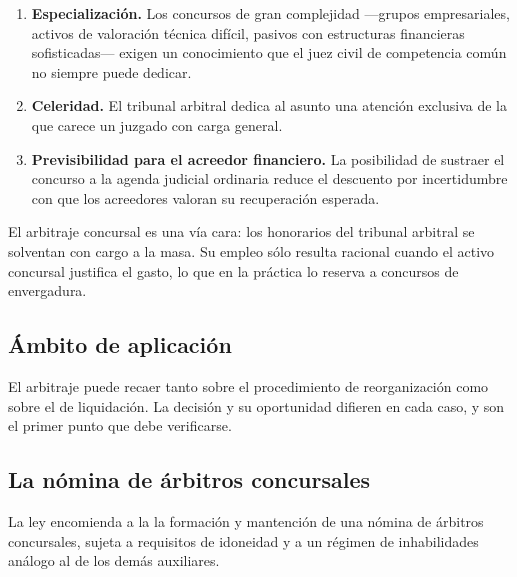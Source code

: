 \begin{enumerate}
  \item \textbf{Especialización.} Los concursos de gran complejidad ---grupos
  empresariales, activos de valoración técnica difícil, pasivos con estructuras
  financieras sofisticadas--- exigen un conocimiento que el juez civil de competencia
  común no siempre puede dedicar.

  \item \textbf{Celeridad.} El tribunal arbitral dedica al asunto una atención exclusiva
  de la que carece un juzgado con carga general.

  \item \textbf{Previsibilidad para el acreedor financiero.} La posibilidad de sustraer
  el concurso a la agenda judicial ordinaria reduce el descuento por incertidumbre con
  que los acreedores valoran su recuperación esperada.
\end{enumerate}

\begin{alerta}
El arbitraje concursal es una vía cara: los honorarios del tribunal arbitral se solventan
con cargo a la masa. Su empleo sólo resulta racional cuando el activo concursal justifica
el gasto, lo que en la práctica lo reserva a concursos de envergadura.
\end{alerta}

\bloqueNormativo

\subsection{Ámbito de aplicación}

El arbitraje puede recaer tanto sobre el procedimiento de reorganización como sobre el de
liquidación. La decisión y su oportunidad difieren en cada caso, y son el primer punto
que debe verificarse.

\subsection{La nómina de árbitros concursales}

La ley encomienda a la \superir{} la formación y mantención de una nómina de árbitros
concursales, sujeta a requisitos de idoneidad y a un régimen de inhabilidades análogo al
de los demás auxiliares.

